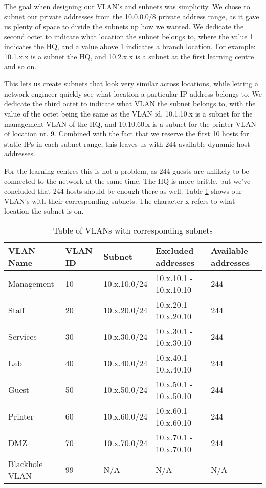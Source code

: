 The goal when designing our VLAN's and subnets was simplicity. We chose to subnet our private addresses from the 10.0.0.0/8 private address range, as it gave us plenty of space to divide the subnets up how we wanted. We dedicate the second octet to indicate what location the subnet belongs to, where the value 1 indicates the HQ, and a value above 1 indicates a branch location. For example: 10.1.x.x is a subnet the HQ, and 10.2.x.x is a subnet at the first learning centre and so on.

This lets us create subnets that look very similar across locations, while letting a network engineer quickly see what location a particular IP address belongs to. We dedicate the third octet to indicate what VLAN the subnet belongs to, with the value of the octet being the same as the VLAN id. 10.1.10.x is a subnet for the management VLAN of the HQ, and 10.10.60.x is a subnet for the printer VLAN of location nr. 9. Combined with the fact that we reserve the first 10 hosts for static IPs in each subnet range, this leaves us with 244 available dynamic host addresses.

For the learning centres this is not a problem, as 244 guests are unlikely to be connected to the network at the same time. The HQ is more brittle, but we've concluded that 244 hosts should be enough there as well. Table \ref{VLANsubnettable} shows our VLAN's with their corresponding subnets. The character x refers to what location the subnet is on.


\begin{table}[H]
\caption{Table of VLANs with corresponding subnets}
\label{VLANsubnettable}
\begin{tabular}{|l|l|l|l|l|}
\hline
\textbf{VLAN Name} & \textbf{VLAN ID} & \textbf{Subnet} & \textbf{Excluded addresses} & \textbf{Available addresses} \\ \hline

Management     & 10      & 10.x.10.0/24 & 10.x.10.1 - 10.x.10.10 & 244 \\ \hline
Staff          & 20      & 10.x.20.0/24 & 10.x.20.1 - 10.x.20.10 & 244 \\ \hline
Services       & 30      & 10.x.30.0/24 & 10.x.30.1 - 10.x.30.10 & 244 \\ \hline
Lab            & 40      & 10.x.40.0/24 & 10.x.40.1 - 10.x.40.10 & 244 \\ \hline
Guest          & 50      & 10.x.50.0/24 & 10.x.50.1 - 10.x.50.10 & 244 \\ \hline
Printer        & 60      & 10.x.60.0/24 & 10.x.60.1 - 10.x.60.10 & 244 \\ \hline
DMZ            & 70      & 10.x.70.0/24 & 10.x.70.1 - 10.x.70.10 & 244 \\ \hline
Blackhole VLAN & 99      & N/A          & N/A                    & N/A \\ \hline
\end{tabular}
\end{table}

